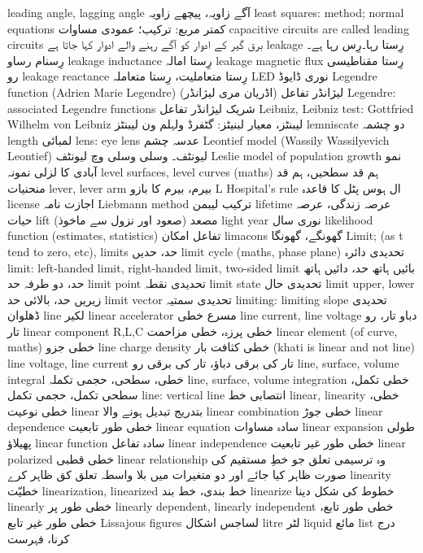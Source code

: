 leading angle, lagging angle	آگے زاویہ، پیچھے زاویہ
least squares: method; normal equations	کمتر مربع: ترکیب؛ عمودی مساوات
capacitive circuits are called leading circuits	برق گیر کے ادوار کو آگے رہنے والے ادوار کہا جاتا ہے
leakage	رِستا رہا۔رِس رہا ہے۔ رِسنام  رساو
leakage inductance	رِستا امالہ
leakage magnetic flux	رِستا مقناطیسی رو
leakage reactance	 رِستا متعاملیت، رِستا متعاملہ
LED	نوری ڈایوڈ
Legendre function (Adrien Marie Legendre)	لیژانڈر تفاعل (اڈریان مری لیژانڈر)
Legendre: associated Legendre functions	شریک لیژانڈر تفاعل
Leibniz, Leibniz test: Gottfried Wilhelm von Leibniz	لیبنٹز، معیار لبنیٹز: گٹفرڈ ولہلم ون لیبنٹز
lemniscate	دو چشمہ
length	لمبائی
lens: eye lens	عدسہ چشم
Leontief model (Wassily Wassilyevich Leontief)	لیونٹف۔ وسلی وسلی وچ لیونٹف
Leslie model of population growth	نمو آبادی کا لزلی نمونہ
level surfaces, level curves (maths)	ہم قد سطحیں، ہم قد منحنیات
lever, lever arm	بیرم، بیرم کا بازو
L Hospital's rule	ال ہوس پٹل کا قاعدہ
license	اجازت نامہ
Liebmann method	ترکیب لیبمن
lifetime	عرصہ زندگی، عرصہ حیات
lift	مصعد  (صعود اور نزول سے ماخوذ)
light year	نوری سال
likelihood function (estimates, statistics)	تفاعل امکان
limacons	گھونگے، گھونگا
Limit; (as t tend to zero, etc), limits	حد، حدیں
limit cycle (maths, phase plane)	تحدیدی دائرہ
limit: left-handed limit, right-handed limit, two-sided limit	بائیں ہاتھ حد، دائیں ہاتھ حد، دو طرفہ حد
limit point	تحدیدی نقطہ
limit state	تحدیدی حال
limit upper, lower	زیریں حد، بالائی حد
limit vector	تحدیدی سمتیہ
limiting: limiting slope	تحدیدی ڈھلوان
line	لکیر
linear accelerator	مسرع خطی
line current, line voltage	دباو تار، رو تار
linear component R,L,C	خطی پرزہ، خطی مزاحمت
linear element (of curve, maths)	خطی جزو
line charge density	خطی کثافت بار  (khati is linear and not line)
line voltage, line current	تار کی برقی دباؤ، تار کی برقی رو
line, surface, volume integral	خطی، سطحی، حجمی تکملہ
line, surface, volume integration	خطی تکمل، سطحی تکمل، حجمی تکمل
line: vertical line	انتصابی خط
linear, linearity 	خطی، خطی نوعیت
linear	بتدریج تبدیل ہونے والا
linear combination	خطی جوڑ
linear dependence	خطی طور تابعیت
linear equation	سادہ مساوات
linear expansion	طولی پھیلاؤ
linear function	سادہ تفاعل
linear independence	خطی طور غیر تابعیت
linear polarized	خطی قطبی
linear relationship	وہ ترسیمی تعلق جو خطِ مستقیم کی صورت ظاہر کیا جائے اور دو متغیرات میں بلا واسطہ تعلق کق ظاہر کرے
linearity	خطیّت
linearization, linearized	خط بندی، خط بند
linearize	خطوط کی شکل دینا
linearly	خطی طور پر
linearly dependent, linearly independent	خطی طور تابع، خطی طور غیر تابع
Lissajous figures	لساجس اشکال
litre	لٹر
liquid	مائع
list	درج کرنا، فہرست
